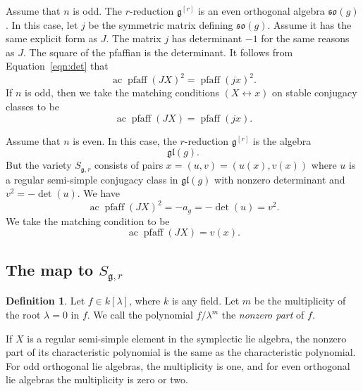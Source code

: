 \documentclass[11pt]{amsart}
\theoremstyle{definition}
\newtheorem{definition}[theorem]{Definition}
\theoremstyle{remark}
\numberwithin{equation}{theorem}
\def\op#1{\operatorname{#1}}
\def\lie#1{{\mathfrak{#1}}}
\begin{document}
Assume that $n$ is odd. The $r$-reduction $\lie{g}^{[r]}$ is an
even orthogonal algebra $\lie{so}(g)$. In this case, let $j$ be
the symmetric matrix defining $\lie{so}(g)$. Assume it has the
same explicit form as $J$.  The matrix $j$ has determinant $-1$
for the same reasons as $J$. The square of the pfaffian is the
determinant.  It follows from Equation~\ref{eqn:det} that
    \begin{equation}
        \op{ac}\op{pfaff}(J X)^{2} = \op{pfaff}(j x)^{2}.
    \end{equation}
If $n$ is odd, then we take the matching conditions
$(X\leftrightarrow x)$ on stable conjugacy classes to be
    \begin{equation}
    \op{ac}\op{pfaff}(J X) = \op{pfaff}(j x).
      \label{eqn:pfaff1}
    \end{equation}

Assume that $n$ is even.  In this case, the $r$-reduction
$\lie{g}^{[r]}$ is the algebra
   \begin{equation}
   \lie{gl}(g).
   \end{equation}
But the variety $S_{\lie{g},r}$ consists of pairs
$x=(u,v)=(u(x),v(x))$ where $u$ is a regular semi-simple conjugacy
class in $\lie{gl}(g)$ with nonzero determinant and $v^2 =
-\det(u)$.  We have
\begin{equation}\op{ac}\op{pfaff}(J X)^2 = - a_g = -\det(u) =
v^2.\end{equation}
We take the matching condition to be
   \begin{equation}
   \op{ac}\op{pfaff}(J X) = v(x).
   \label{eqn:pfaff2}
   \end{equation}

\subsection{The map to $S_{\lie{g},r}$}

\begin{definition}  Let $f\in k[\lambda]$, where $k$ is any field.
Let $m$ be the multiplicity of the root $\lambda=0$ in $f$.  We
call the polynomial $f/\lambda^m$ the {\it nonzero part\/} of $f$.
\end{definition}

If $X$ is a regular semi-simple element in the symplectic lie
algebra, the nonzero part of its characteristic polynomial is the
same as the characteristic polynomial.  For odd orthogonal lie
algebras, the multiplicity is one, and for even orthogonal lie
algebras the multiplicity is zero or two.
\end{document}
